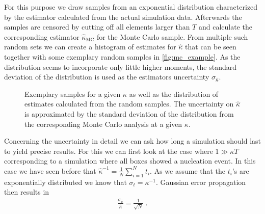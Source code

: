 For this purpose we draw samples from an exponential distribution characterized by the estimator calculated from the actual simulation data. Afterwards the samples are censored by cutting off all elements larger than $T$ and calculate the corresponding estimator $\hat{\kappa}_{\text{MC}}$ for the Monte Carlo sample. From multiple such random sets we can create a histogram of estimates for $\hat{\kappa}$ that can be seen together with some exemplary random samples in \autoref{fig:mc_example}. As the distribution seems to incorporate only little higher moments, the standard deviation of the distribution is used as the estimators uncertainty $\sigma_{\hat{\kappa}}$.\\

\begin{figure}[ht]
 \hspace{0.5cm}
\caption[Monte Carlo uncertainty estimation example]{Exemplary samples for a given $\kappa$ as well as the distribution of estimates calculated from the random samples. The uncertainty on $\hat{\kappa}$ is approximated by the standard deviation of the distribution from the corresponding Monte Carlo analysis at a given $\kappa$.}
\label{fig:mc_example}
\end{figure}
Concerning the uncertainty in detail we can ask how long a simulation should last to yield precise results. For this we can first look at the case where $1 \gg \kappa T$ corresponding to a simulation where all boxes showed a nucleation event. In this case we have seen before that $\hat{\kappa}^{-1} = \frac{1}{N} \sum_{i=1}^N t_i$. As we assume that the $t_i$'s are exponentially distributed we know that $\sigma_{t} = \kappa^{-1}$. Gaussian error propagation then results in
\begin{align}
\label{eqn:uncertainty_k_gg}
\frac{\sigma_{\hat{\kappa}}}{\hat{\kappa}} = \frac{1}{\sqrt{N}} \; \text{.}
\end{align}
